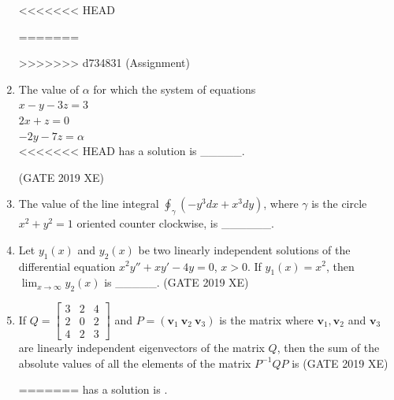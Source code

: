 \documentclass[journal,12pt,onecolumn]{IEEEtran}
\newcommand{\myvec}[1]{\begin{bmatrix}#1\end{bmatrix}}
\begin{document}
\begin{enumerate}
\begin{multicols}{2}
<<<<<<< HEAD
\end{multicols}
=======

\newpage
>>>>>>> d734831 (Assignment)

\item The value of $\alpha$ for which the system of equations\\
$x-y-3z=3$\\
$2x+z=0$\\
$-2y-7z=\alpha$\\
<<<<<<< HEAD
 has a solution is \_\_\_\_\_.

\hfill{(GATE 2019 XE)} \\

\item The value of the line integral $\displaystyle \oint_{\gamma}(-y^3dx + x^3dy)$, where $\gamma$ is the circle $x^2+y^2=1$ oriented counter clockwise, is \_\_\_\_\_\_. \\


\item Let $y_1(x)$ and $y_2(x)$ be two linearly independent solutions of the differential equation $x^2y''+xy'-4y=0$, $x>0$. If $y_1(x)=x^2$, then $\displaystyle \lim_{x\to\infty} y_2(x)$ is \_\_\_\_\_.
\hfill{(GATE 2019 XE)} \\

\newpage 

\item If 
$Q = \myvec{3 & 2 & 4 \\ 2 & 0 & 2 \\ 4 & 2 & 3}$ and $P=(\mathbf{v}_1\ \mathbf{v}_2\ \mathbf{v}_3)$ is the matrix where $\mathbf{v}_1, \mathbf{v}_2$ and $\mathbf{v}_3$ are linearly independent eigenvectors of the matrix $Q$, then the sum of the absolute values of all the elements of the matrix $P^{-1}QP$ is
\hfill{(GATE 2019 XE)} \\

\begin{multicols}{2}
\begin{enumerate}
=======
 has a solution is \underline{\hspace{2cm}}.


\end{enumerate}
\end{multicols}
\end{enumerate}
\end{document}
